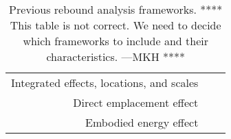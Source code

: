 
\begin{landscape}
\begin{table}
\begin{center}
\caption{Previous rebound analysis frameworks. **** This table is not correct. We need to decide which
           frameworks to include and their characteristics. ---MKH ****}
\begin{tabular}{r c c}
  \toprule
                                            & \rot{\citet{Thomas:2013aa}} 
                                            & \rot{\citet{Borenstein:2015aa}} \\
  \midrule
  Integrated effects, locations, and scales &    &     \\
  Direct emplacement effect                 &    &     \\
  Embodied energy effect                    &    &     \\
  \bottomrule
\end{tabular}
\label{tab:previous_frameworks}
\end{center}
\end{table}
\end{landscape}




